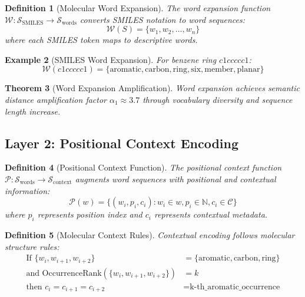 \documentclass[12pt,a4paper]{article}
\newtheorem{theorem}{Theorem}[section]
\newtheorem{definition}[theorem]{Definition}
\newtheorem{example}[theorem]{Example}
\begin{document}
\begin{definition}[Molecular Word Expansion]
The word expansion function $\mathcal{W}: \mathcal{S}_{\text{SMILES}} \rightarrow \mathcal{S}_{\text{words}}$ converts SMILES notation to word sequences:
\begin{equation}
\mathcal{W}(S) = \{w_1, w_2, \ldots, w_n\}
\end{equation}
where each SMILES token maps to descriptive words.
\end{definition}

\begin{example}[SMILES Word Expansion]
For benzene ring $c1ccccc1$:
\begin{equation}
\mathcal{W}(c1ccccc1) = \{\text{aromatic}, \text{carbon}, \text{ring}, \text{six}, \text{member}, \text{planar}\}
\end{equation}
\end{example}

\begin{theorem}[Word Expansion Amplification]
Word expansion achieves semantic distance amplification factor $\alpha_1 \approx 3.7$ through vocabulary diversity and sequence length increase.
\end{theorem}

\subsection{Layer 2: Positional Context Encoding}

\begin{definition}[Positional Context Function]
The positional context function $\mathcal{P}: \mathcal{S}_{\text{words}} \rightarrow \mathcal{S}_{\text{context}}$ augments word sequences with positional and contextual information:
\begin{equation}
\mathcal{P}(w) = \{(w_i, p_i, c_i) : w_i \in w, p_i \in \mathbb{N}, c_i \in \mathcal{C}\}
\end{equation}
where $p_i$ represents position index and $c_i$ represents contextual metadata.
\end{definition}

\begin{definition}[Molecular Context Rules]
Contextual encoding follows molecular structure rules:
\begin{align}
\text{If } \{w_i, w_{i+1}, w_{i+2}\} &= \{\text{aromatic}, \text{carbon}, \text{ring}\} \\
\text{and OccurrenceRank}(\{w_i, w_{i+1}, w_{i+2}\}) &= k \\
\text{then } c_i = c_{i+1} = c_{i+2} &= \text{k-th\_aromatic\_occurrence}
\end{align}
\end{definition}
\end{document}
